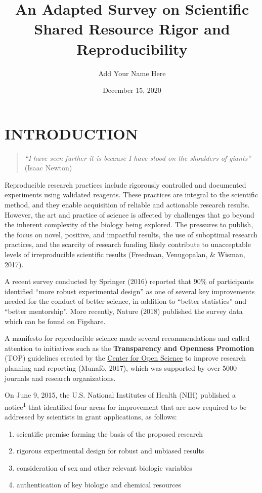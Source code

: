 \documentclass[]{article}
\title{An Adapted Survey on Scientific Shared Resource Rigor and
Reproducibility}
\author{Add Your Name Here}
\date{December 15, 2020}
\begin{document}
\maketitle

\section{INTRODUCTION}\label{introduction}

\begin{quote}
\emph{``I have seen further it is because I have stood on the shoulders
of giants''} (Isaac Newton)
\end{quote}

Reproducible research practices include rigorously controlled and
documented experiments using validated reagents. These practices are
integral to the scientific method, and they enable acquisition of
reliable and actionable research results. However, the art and practice
of science is affected by challenges that go beyond the inherent
complexity of the biology being explored. The pressures to publish, the
focus on novel, positive, and impactful results, the use of suboptimal
research practices, and the scarcity of research funding likely
contribute to unacceptable levels of irreproducible scientific results
(Freedman, Venugopalan, \& Wisman, 2017).

A recent survey conducted by Springer (2016) reported that 90\% of
participants identified ``more robust experimental design'' as one of
several key improvements needed for the conduct of better science, in
addition to ``better statistics'' and ``better mentorship''. More
recently, Nature (2018) published the survey data which can be found on
Figshare.

A manifesto for reproducible science made several recommendations and
called attention to initiatives such as the \textbf{Transparency and
Openness Promotion} (TOP) guidelines created by the
\href{https://www.cos.io/}{Center for Open Science} to improve research
planning and reporting (Munafò, 2017), which was supported by over 5000
journals and research organizations.

On June 9, 2015, the U.S. National Institutes of Health (NIH) published
a notice\textsuperscript{1} that identified four areas for improvement
that are now required to be addressed by scientists in grant
applications, as follows:

\begin{enumerate}
\def\labelenumi{\arabic{enumi}.}
\item
  scientific premise forming the basis of the proposed research
\item
  rigorous experimental design for robust and unbiased results
\item
  consideration of sex and other relevant biologic variables
\item
  authentication of key biologic and chemical resources
\end{enumerate}
\end{document}
